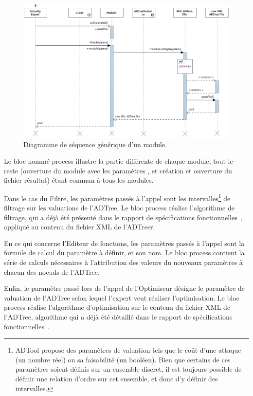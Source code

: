 	    \begin{figure}[H]
	        \centering
	        \includegraphics[height=0.75\textwidth]{figure/moduleSeqDiag.png}
	        \caption{Diagramme de séquence générique d'un module.}
	        \label{fig:moduleseq}
	    \end{figure}

Le bloc nommé \og process \fg{} illustre la partie différente de chaque module, tout le reste (ouverture du module avec les paramètres , et création et ouverture du fichier résultat) étant commun à tous les modules.

Dans le cas du Filtre, les paramètres passés à l'appel sont les intervalles\footnote{ADTool propose des paramètres de valuation tels que le coût d'une attaque (un nombre réel) ou sa faisabilité (un booléen). Bien que certains de ces paramètres soient définis sur un ensemble discret, il est toujours possible de définir une relation d'ordre sur cet ensemble, et donc d'y définir des intervalles.} de filtrage sur les valuations de l'ADTree. Le bloc process réalise l'algorithme de filtrage, qui a déjà été présenté dans le rapport de spécifications fonctionnelles~\cite{spec_fonc}, appliqué au contenu du fichier XML de l'ADTreer.

En ce qui concerne l'Editeur de fonctions, les paramètres passés à l'appel sont la formule de calcul du paramètre à définir, et son nom. Le bloc process contient la série de calculs nécessaires à l'attribution des valeurs du nouveaux paramètres à chacun des noeuds de l'ADTree.  

Enfin, le paramètre passé lors de l'appel de l'Optimiseur désigne le paramètre de valuation de l'ADTree selon lequel l'expert veut réaliser l'optimisation. Le bloc process réalise l'algorithme d'optimisation sur le contenu du fichier XML de l'ADTree, algorithme qui a déjà été détaillé dans le rapport de spécifications fonctionnelles~\cite{spec_fonc}. 